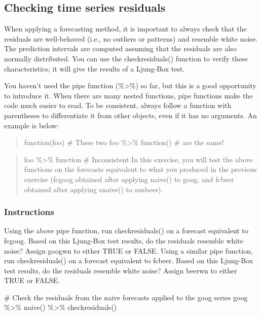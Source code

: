 \documentclass[
  letterpaper,
  DIV=11,
  numbers=noendperiod]{scrartcl}
\newenvironment{Shaded}{\begin{snugshade}}{\end{snugshade}}
\newcommand{\CommentTok}[1]{\textcolor[rgb]{0.37,0.37,0.37}{#1}}
\newcommand{\FunctionTok}[1]{\textcolor[rgb]{0.28,0.35,0.67}{#1}}
\newcommand{\NormalTok}[1]{\textcolor[rgb]{0.00,0.23,0.31}{#1}}
\newcommand{\SpecialCharTok}[1]{\textcolor[rgb]{0.37,0.37,0.37}{#1}}
\begin{document}
\hypertarget{checking-time-series-residuals}{%
\subsection{Checking time series
residuals}\label{checking-time-series-residuals}}

When applying a forecasting method, it is important to always check that
the residuals are well-behaved (i.e., no outliers or patterns) and
resemble white noise. The prediction intervals are computed assuming
that the residuals are also normally distributed. You can use the
checkresiduals() function to verify these characteristics; it will give
the results of a Ljung-Box test.

You haven't used the pipe function (\%\textgreater\%) so far, but this
is a good opportunity to introduce it. When there are many nested
functions, pipe functions make the code much easier to read. To be
consistent, always follow a function with parentheses to differentiate
it from other objects, even if it has no arguments. An example is below:

\begin{quote}
function(foo) \# These two foo \%\textgreater\% function() \# are the
same!
\end{quote}

\begin{quote}
foo \%\textgreater\% function \# Inconsistent In this exercise, you will
test the above functions on the forecasts equivalent to what you
produced in the previous exercise (fcgoog obtained after applying
naive() to goog, and fcbeer obtained after applying snaive() to
ausbeer).
\end{quote}

\hypertarget{instructions-5}{%
\subsubsection{Instructions}\label{instructions-5}}

Using the above pipe function, run checkresiduals() on a forecast
equivalent to fcgoog. Based on this Ljung-Box test results, do the
residuals resemble white noise? Assign googwn to either TRUE or FALSE.
Using a similar pipe function, run checkresiduals() on a forecast
equivalent to fcbeer. Based on this Ljung-Box test results, do the
residuals resemble white noise? Assign beerwn to either TRUE or FALSE.

\begin{Shaded}
\begin{Highlighting}[]
\CommentTok{\# Check the residuals from the naive forecasts applied to the goog series}
\NormalTok{goog }\SpecialCharTok{\%\textgreater{}\%} \FunctionTok{naive}\NormalTok{() }\SpecialCharTok{\%\textgreater{}\%} \FunctionTok{checkresiduals}\NormalTok{()}
\end{Highlighting}
\end{Shaded}
\end{document}
